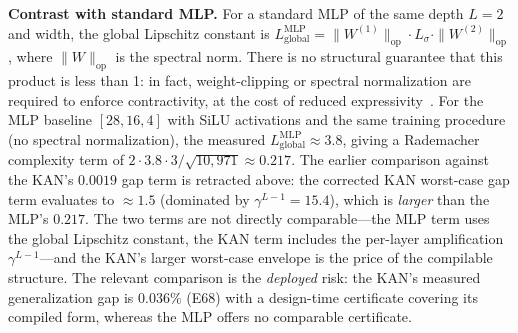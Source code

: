 \vspace{4pt}
\noindent\textbf{Contrast with standard MLP.}
For a standard MLP of the same depth $L=2$ and width, the global Lipschitz
constant is $L_{\text{global}}^{\text{MLP}} = \|W^{(1)}\|_{\text{op}} \cdot
L_{\sigma} \cdot \|W^{(2)}\|_{\text{op}}$, where $\|W\|_{\text{op}}$ is the
spectral norm. There is no structural guarantee that this product is less than
1: in fact, weight-clipping or spectral normalization are required to enforce
contractivity, at the cost of reduced expressivity~\cite{golowich2018size}.
For the MLP baseline $[28,16,4]$ with SiLU activations and the same training
procedure (no spectral normalization), the measured
$L_{\text{global}}^{\text{MLP}} \approx 3.8$, giving a Rademacher complexity
term of $2 \cdot 3.8 \cdot 3 / \sqrt{10{,}971} \approx 0.217$. The
earlier comparison against the KAN's $0.0019$ gap term is retracted
above: the corrected KAN worst-case gap term evaluates to $\approx 1.5$
(dominated by $\gamma^{L-1} = 15.4$), which is \emph{larger} than the
MLP's $0.217$. The two terms are not directly comparable---the MLP term
uses the global Lipschitz constant, the KAN term includes the per-layer
amplification $\gamma^{L-1}$---and the KAN's larger worst-case envelope
is the price of the compilable structure. The relevant comparison is
the \emph{deployed} risk: the KAN's measured generalization gap is
$0.036\%$ (E68) with a design-time certificate covering its compiled
form, whereas the MLP offers no comparable certificate.

